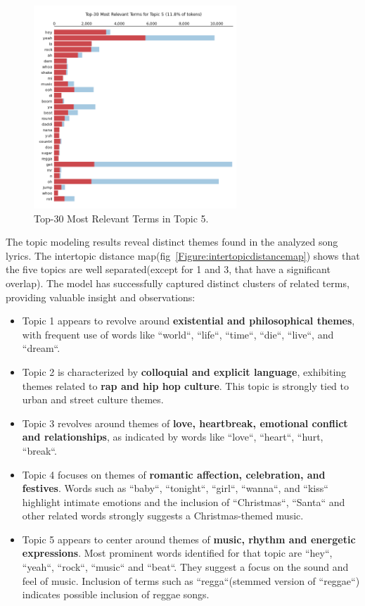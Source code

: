\begin{center}
\begin{figure}[H]
  \centering
  \includegraphics[width=3in]{img/topics/png/t5.png}
  \caption{Top-30 Most Relevant Terms in Topic 5.}
  \label{Figure:fig_eh}
\end{figure}
\end{center}


The topic modeling results reveal distinct themes found in the analyzed song
lyrics. The intertopic distance map(fig~\ref{Figure:intertopicdistancemap}) shows
that the five topics are well separated(except for 1 and 3, that have a
significant overlap). The model has successfully captured distinct clusters of
related terms, providing valuable insight and observations:

\begin{itemize}
    \item Topic 1 appears to revolve around \textbf{existential and philosophical
      themes}, with frequent use of words like ``world``, ``life``, ``time``,
      ``die``, ``live``, and ``dream``.
    \item Topic 2 is characterized by \textbf{colloquial and explicit
      language}, exhibiting themes related to \textbf{rap and hip hop culture}.
      This topic is strongly tied to urban and street culture themes.
    \item Topic 3 revolves around themes of \textbf{love, heartbreak, emotional
      conflict and relationships}, as indicated by words like ``love``,
      ``heart``, ``hurt, ``break``.
    \item Topic 4 focuses on themes of \textbf{romantic affection, celebration,
      and festives}. Words such as ``baby``, ``tonight``, ``girl``, ``wanna``,
      and ``kiss`` highlight intimate emotions and the inclusion of
      ``Christmas``, ``Santa`` and other related words strongly suggests a
      Christmas-themed music.
    \item Topic 5 appears to center around themes of \textbf{music, rhythm and
      energetic expressions}. Most prominent words identified for that topic
      are ``hey``, ``yeah``, ``rock``, ``music`` and ``beat``. They suggest a
      focus on the sound and feel of music. Inclusion of terms such as
      ``regga``(stemmed version of ``reggae``) indicates possible inclusion of
      reggae songs.
\end{itemize}

